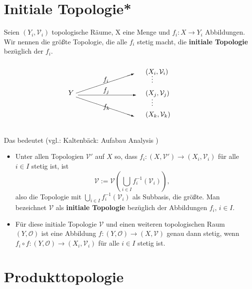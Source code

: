 \section{Initiale Topologie*}

Seien $(Y_i, \mathcal{V}_i)$ topologische Räume, X eine Menge
und $f_i : X \to Y_i$ Abbildungen.
Wir nennen die  größte Topologie, die alle $f_i$ stetig macht, 
die \textbf{initiale Topologie} bezüglich der $f_i$.
$$
\setlength{\unitlength}{1cm}
\begin{picture}(6,3.5)
  \put(0,1.7){$Y$}

  \put(0.4,1.8){\vector(3,1){3}}
  \put(0.5,1.7){\vector(1,0){3}}
  \put(0.4,1.6){\vector(3,-1){3}}

  \put(4,2.8){$(X_i, \mathcal{V}_i)$}
  \put(4,1.7){$(X_j, \mathcal{V}_j)$}
  \put(4,0.6){$(X_k, \mathcal{V}_k)$}

  \put(1.8,2.4){$f_i$}
  \put(1.8,1.85){$f_j$}
  \put(1.8,1.0){$f_k$}

  \put(4.3,2.35){$\vdots$}
  \put(4.3,1.15){$\vdots$}
\end{picture}
$$

Das bedeutet (vgl.: Kaltenbäck: Aufabau Analysis ) 
\begin{itemize}
    \item Unter allen Topologien $\mathcal{V}'$ auf $X$ so, dass 
    $f_i : (X, \mathcal{V}') \to (X_i, \mathcal{V}_i)$ für alle $i \in I$
    stetig ist, ist 
    $$
    \mathcal{V} := \mathcal{V}\!\left( \bigcup_{i \in I} f_i^{-1}(\mathcal{V}_i) 
    \right),
    $$
    also die Topologie mit $\bigcup_{i \in I} f_i^{-1}(\mathcal{V}_i)$ 
    als Subbasis, die größte.  
    Man bezeichnet $\mathcal{V}$ als \textbf{initiale Topologie} 
    bezüglich der Abbildungen $f_i$, $i \in I$.

    \item Für diese initiale Topologie $\mathcal{V}$ 
    und einen weiteren topologischen Raum $(Y, \mathcal{O})$ 
    ist eine Abbildung $f : (Y, \mathcal{O}) \to (X, \mathcal{V})$ 
    genau dann stetig, 
    wenn $f_i \circ f : (Y, \mathcal{O}) \to (X_i, \mathcal{V}_i)$ 
    für alle $i \in I$ stetig ist.
\end{itemize}

\section{Produkttopologie}




